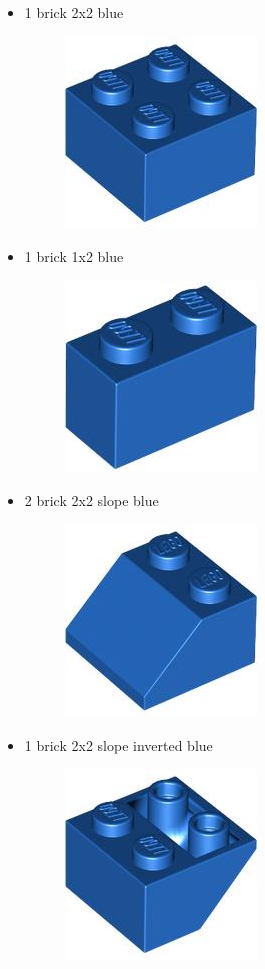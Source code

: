 \documentclass[a4paper,10pt]{article}
\begin{document}
	 \begin{itemize}
	 	\item 1 brick 2x2 blue
	 		\begin{figure}[H]
 	  		\centering
 	  		\includegraphics[scale=.2]{brick_2x2_blue.jpg}
		 	\end{figure}
		 	
		 \item 1 brick 1x2 blue
		 	\begin{figure}[H]
 		  	\centering
 		  	\includegraphics[scale=.2]{brick_1x2_blue.jpg}
		 	\end{figure} 
		 	
		 \item 2 brick 2x2 slope blue
                \begin{figure}[H]
 		  	\centering
 		  	\includegraphics[scale=.2]{brick_2x2_slope_blue.jpg}
		 	\end{figure}
		 	
		 \item 1 brick 2x2 slope inverted blue
		 	\begin{figure}[H]
 		  	\centering
 		  	\includegraphics[scale=.2]{brick_2x2_slope_inverted_blue.jpg}
		 	\end{figure}
          

\end{itemize}
\end{document}
